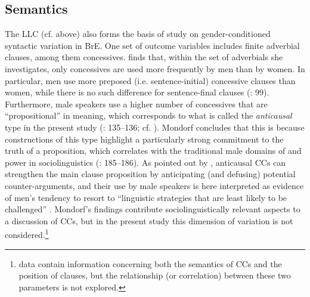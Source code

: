 \subsection{\label{bkm:Ref80603607}Semantics}\label{sec:5.1.2}

The LLC (cf. \citealt{Altenberg1986} above) also forms the basis of  study on gender-conditioned syntactic variation in BrE. One set of outcome variables includes finite adverbial clauses, among them concessives. \citet[85–86]{Mondorf2004} finds that, within the set of adverbials she investigates, only concessives are used more frequently by men than by women. In particular, men use more preposed (i.e. sentence-initial) concessive clauses than women, while there is no such difference for sentence-final clauses (\citeyear{Mondorf2004}: 99). Furthermore, male speakers use a higher number of concessives that are “propositional” in meaning, which corresponds to what is called the \textit{anticausal} type in the present study (\citeyear{Mondorf2004}: 135–136; cf. ). Mondorf concludes that this is because constructions of this type highlight a particularly strong commitment to the truth of a proposition, which correlates with the traditional male domains of  and power in sociolinguistics (\citeyear{Mondorf2004}: 185–186). As pointed out by \citet{Azar1997}, anticausal CCs can strengthen the main clause proposition by anticipating (and defusing) potential counter-arguments, and their use by male speakers is here interpreted as evidence of men’s tendency to resort to “linguistic strategies that are least likely to be challenged” \citep[186]{Mondorf2004}. Mondorf’s findings contribute sociolinguistically relevant aspects to a discussion of CCs, but in the present study this dimension of variation is not considered.\footnote{ data contain information concerning both the semantics of CCs and the position of clauses, but the relationship (or correlation) between these two parameters is not explored.}

